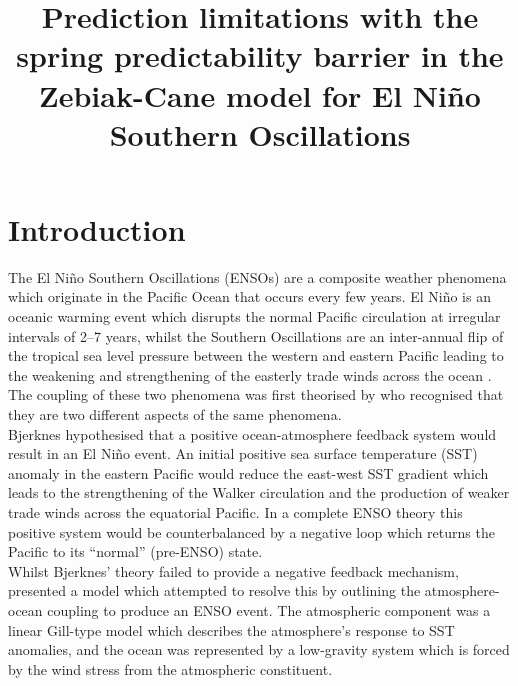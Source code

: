 \documentclass[12pt, onecolumn]{revtex4}    %
\begin{document}
                     

\title{Prediction limitations with the spring predictability barrier in the Zebiak-Cane model for El Ni\~{n}o Southern Oscillations} 

\maketitle
\thispagestyle{plain} %

\section{Introduction}
\noindent
The El Ni\~{n}o Southern Oscillations (ENSOs) are a composite weather phenomena which originate in the Pacific Ocean that occurs every few years. El Ni\~{n}o is an oceanic warming event which disrupts the normal Pacific circulation at irregular intervals of 2--7 years, whilst the Southern Oscillations are an inter-annual flip of the tropical sea level pressure between the western and eastern Pacific leading to the weakening and strengthening of the easterly trade winds across the ocean \citep{wang2017nino}. The coupling of these two phenomena was first theorised by \cite{doi:10.1175/1520-04931969097} who recognised that they are two different aspects of the same phenomena. \\

Bjerknes hypothesised that a positive ocean-atmosphere feedback system would result in an El Ni\~{n}o event. An initial positive sea surface temperature (SST) anomaly in the eastern Pacific would reduce the east-west SST gradient which leads to the strengthening of the Walker circulation and the production of weaker trade winds across the equatorial Pacific. In a complete ENSO theory this positive system would be counterbalanced by a negative loop which returns the Pacific to its ``normal'' (pre-ENSO) state. \\

Whilst Bjerknes' theory failed to provide a negative feedback mechanism, \cite{Zebiak:1987aa} presented a model which attempted to resolve this by outlining the atmosphere-ocean coupling to produce an ENSO event. The atmospheric component was a linear Gill-type model \citep{Gill:1980aa} which describes the atmosphere's response to SST anomalies, and the ocean was represented by a low-gravity system which is forced by the wind stress from the atmospheric constituent. \\
\end{document}
